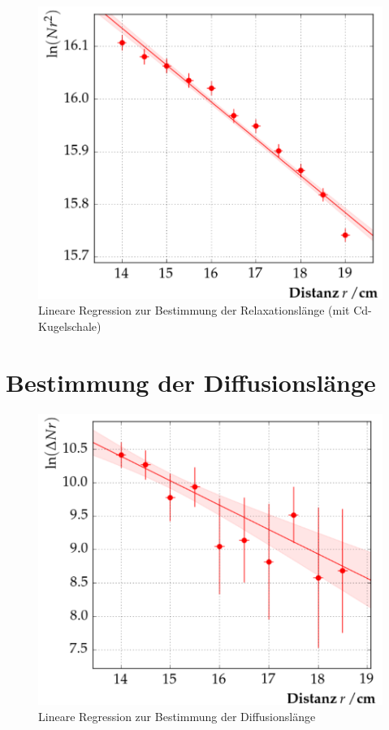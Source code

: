\begin{figure}[tb]
  \centering
  \includegraphics[scale=0.5]{./fig/plot2.png}
  \caption{Lineare Regression zur Bestimmung der Relaxationslänge (mit Cd-Kugelschale)}
  \label{fig:plot2}
\end{figure}

\section{Bestimmung der Diffusionslänge}

\begin{figure}[tb]
  \centering
  \includegraphics[scale=0.5]{./fig/plot3.png}
  \caption{Lineare Regression zur Bestimmung der Diffusionslänge}
  \label{fig:plot3}
\end{figure}

